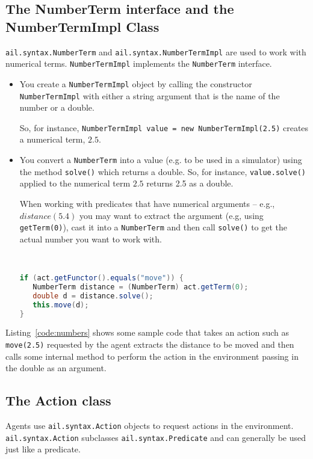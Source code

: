 \subsection{The NumberTerm interface and the NumberTermImpl Class}
\texttt{ail.syntax.NumberTerm} and \texttt{ail.syntax.NumberTermImpl} are used to work with numerical terms.  \texttt{NumberTermImpl} implements the \texttt{NumberTerm} interface. 
\begin{itemize}
\item You create a \texttt{NumberTermImpl} object by calling the constructor \texttt{NumberTermImpl} with either a string argument that is the name of the number or a double.

So, for instance, \texttt{NumberTermImpl value = new NumberTermImpl(2.5)} creates a numerical term, $2.5$.
\item You convert a \texttt{NumberTerm} into a value (e.g. to be used in a simulator) using the method \texttt{solve()} which returns a double.  So, for instance, \texttt{value.solve()} applied to the numerical term $2.5$ returns 2.5 as a double.

When working with predicates that have numerical arguments -- e.g., $distance(5.4)$ you may want to extract the argument (e.g, using \texttt{getTerm(0)}), cast it into a \texttt{NumberTerm} and then call \texttt{solve()} to get the actual number you want to work with.
\begin{ourexample}
\label{code:numbers} \quad \\
\begin{lstlisting}[basicstyle=\sffamily,language=Java,style=easslisting]
if (act.getFunctor().equals("move")) {
   NumberTerm distance = (NumberTerm) act.getTerm(0);
   double d = distance.solve();
   this.move(d);
}
\end{lstlisting}
\end{ourexample}
\end{itemize}
Listing~\ref{code:numbers} shows some sample code that takes an action such as \texttt{move(2.5)} requested by the agent extracts the distance to be moved and then calls some internal method to perform the action in the environment passing in the double as an argument.

\subsection{The Action class}
Agents use \texttt{ail.syntax.Action} objects to request actions in the environment.  \texttt{ail.syntax.Action} subclasses \texttt{ail.syntax.Predicate} and can generally be used just like a predicate.

